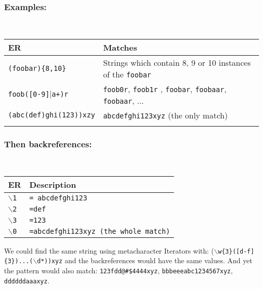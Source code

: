 \subsubsection{Examples:}\\

\begin{footnotesize}
  \begin{tabularx}{\textwidth}{>{\hsize=0.3\hsize}X>{\hsize=0.7\hsize}X}\\
    \hline
    \textbf{ER} & \textbf{Matches} \\
    \hline
    \texttt{(foobar)\{8,10\}} & Strings which contain 8, 9 or 10 instances of the \texttt{foobar} \\
    \texttt{foob([0-9]$|$a+)r} & \texttt{foob0r}, \texttt{foob1r} , \texttt{foobar}, \texttt{foobaar}, \texttt{foobaar}, ... \\
    \texttt{(abc(def)ghi(123))xzy} & \texttt{abcdefghi123xyz} (the only match) \\
    \hline
    \\
  \end{tabularx}
\end{footnotesize}


\subsubsection{Then backreferences:}\\

\begin{footnotesize}
  \begin{tabularx}{\textwidth}{>{\hsize=0.3\hsize}X>{\hsize=0.7\hsize}X}\\
    \hline
    \textbf{ER} & \textbf{Description} \\
    \hline
    \texttt{$\backslash$1} & \texttt{= abcdefghi123} \\
    \texttt{$\backslash$2} & \texttt{=def} \\
    \texttt{$\backslash$3} & \texttt{=123} \\
    \texttt{$\backslash$0} & \texttt{=abcdefghi123xyz (the whole match)} \\
    \hline
  \end{tabularx}
\end{footnotesize}

We could find the same string using metacharacter Iterators with:
(\texttt{$\backslash$w\{3\}([d-f]\{3\})...($\backslash$d*))xyz} and the
backreferences would have the same values. And yet the pattern would
also match: \texttt{123fdd@\#\$4444xyz}, \texttt{bbbeeeabc1234567xyz},
\texttt{ddddddaaaxyz}.


